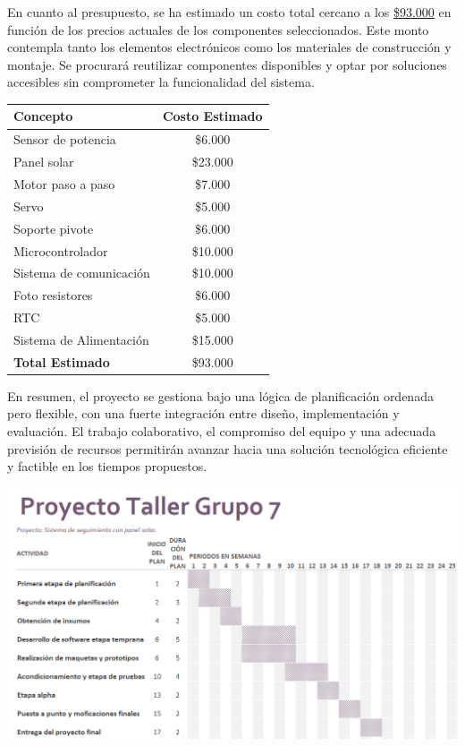 \documentclass[a4paper,12pt]{article}
\begin{document}
En cuanto al presupuesto, se ha estimado un costo total cercano a los \hyperref[tabla]{\$93.000} en función de los precios actuales de los componentes seleccionados. Este monto contempla tanto los elementos electrónicos como los materiales de construcción y montaje. Se procurará reutilizar componentes disponibles y optar por soluciones accesibles sin comprometer la funcionalidad del sistema.\\

\begin{table}[h!]
        \centering
        \begin{tabular}{|l|c|}
            \hline
            Concepto  & Costo Estimado \\ 
            \hline
            Sensor de potencia & \$6.000 \\
            Panel solar  & \$23.000 \\
            Motor paso a paso  & \$7.000 \\
            Servo & \$5.000 \\
            Soporte pivote & \$6.000 \\
            Microcontrolador  & \$10.000 \\
            Sistema de comunicación  & \$10.000 \\
            Foto resistores  & \$6.000 \\
            RTC  & \$5.000 \\
            Sistema de Alimentación  & \$15.000 \\
            \hline
            \textbf{Total Estimado} & \$93.000 \\
            \hline
        \end{tabular}
        \label{tabla}
    \end{table}

En resumen, el proyecto se gestiona bajo una lógica de planificación ordenada pero flexible, con una fuerte integración entre diseño, implementación y evaluación. El trabajo colaborativo, el compromiso del equipo y una adecuada previsión de recursos permitirán avanzar hacia una solución tecnológica eficiente y factible en los tiempos propuestos.\\




\newpage
\begin{landscape}
    \thispagestyle{empty} %
    \begin{center}
        \includegraphics[width=0.95\linewidth]{grantt-V2.png}
        \label{cronograma}
    \end{center}
\end{landscape}
\end{document}
